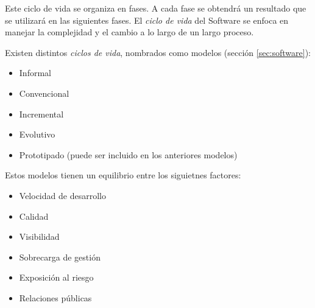 Este ciclo de vida se organiza en fases. A cada fase se obtendrá un
resultado que se utilizará en las siguientes fases. El \emph{ciclo de
  vida} del Software se enfoca en manejar la complejidad y el cambio
a lo largo de un largo proceso.

Existen distintos \emph{ciclos de vida}, nombrados como modelos
(sección \ref{sec:software}):
\begin{itemize}[noitemsep]
\item Informal
\item Convencional
\item Incremental
\item Evolutivo
\item Prototipado (puede ser incluido en los anteriores modelos)
\end{itemize}

Estos modelos tienen un equilibrio entre los siguietnes factores:
\begin{itemize}[noitemsep]
\item Velocidad de desarrollo
\item Calidad
\item Visibilidad
\item Sobrecarga de gestión
\item Exposición al riesgo
\item Relaciones públicas
\end{itemize}